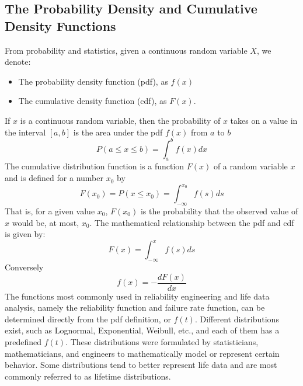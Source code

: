 \subsection{The Probability Density and Cumulative Density Functions}
From probability and statistics, given a continuous random variable $X$, we denote:
\begin{itemize}
	\item The probability density function (pdf), as $f(x)$
	\item The cumulative density function (cdf), as $F(x)$.
\end{itemize}
If $x$ is a continuous random variable, then the probability of $x$ takes on a value in the
interval $[a,b]$ is the area under the pdf $f(x)$ from $a$ to $b$
\begin{equation}
  P(a\leq x\leq b) = \int_{a}^{b} f(x)dx
\end{equation}
The cumulative distribution function is a function $F(x)$ of a random variable $x$ and is
defined for a number $x_0$ by
\begin{equation}
  F(x_0) = P(x\leq x_0) = \int_{-\infty}^{x_0} f(s)ds
\end{equation}
That is, for a given value $x_0$, $F(x_0)$ is the probability that the observed value of $x$
would be, at most, $x_0$. The mathematical relationship between the pdf and cdf is given by:
\begin{equation}
  F(x) = \int_{-\infty}^{x} f(s)ds
\end{equation}
Conversely
\begin{equation}
  f(x) = - \frac{dF(x)}{dx}
\end{equation}
The functions most commonly used in reliability engineering and life data analysis, namely the
reliability function and failure rate function, can be determined directly from the pdf definition,
or $f(t)$. Different distributions exist, such as Lognormal, Exponential, Weibull, etc., and each of
them has a predefined $f(t)$. These distributions were formulated by statisticians, mathematicians,
and engineers to mathematically model or represent certain behavior. Some distributions tend to better
represent life data and are most commonly referred to as lifetime distributions.

